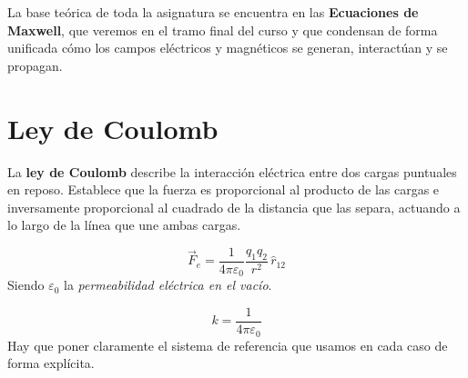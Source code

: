 \documentclass[a4paper,12pt]{article}
\begin{document}
\noindent
La base teórica de toda la asignatura se encuentra en las \textbf{Ecuaciones de Maxwell}, que veremos en el tramo final del curso y que condensan de forma unificada cómo los campos eléctricos y magnéticos se generan, interactúan y se propagan.

\newpage

\section{Ley de Coulomb}

\noindent
La \textbf{ley de Coulomb} describe la interacción eléctrica entre dos cargas puntuales en reposo. 
Establece que la fuerza es proporcional al producto de las cargas e inversamente proporcional al cuadrado de la distancia que las separa, 
actuando a lo largo de la línea que une ambas cargas.

\[
\vec{F}_e = \frac{1}{4\pi\varepsilon_0} \frac{q_1 q_2}{r^2} \, \hat{r}_{12}
\]
Siendo $\varepsilon_0$ la \textit{permeabilidad eléctrica en el vacío}.

\[
k = \frac{1}{4\pi\varepsilon_0}
\]
Hay que poner claramente el sistema de referencia que usamos en cada caso de forma explícita.  
\end{document}
